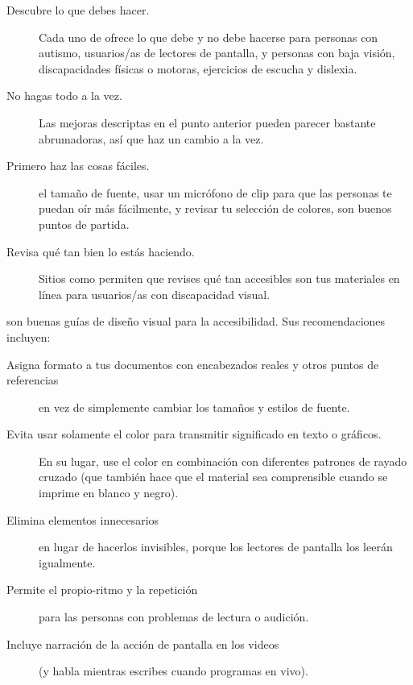 \begin{description}

\item[Descubre lo que debes hacer.]
   Cada uno de 
  ofrece lo que debe y no debe hacerse para personas con autismo,
  usuarios/as de lectores de pantalla,
  y personas con baja visión,
  discapacidades físicas o motoras,
  ejercicios de escucha
  y dislexia.

\item[No hagas todo a la vez.]
  Las mejoras descriptas en el punto anterior pueden parecer bastante abrumadoras,
  así que haz un cambio a la vez.

\item[Primero haz las cosas fáciles.]
  el tamaño de fuente,
  usar un micrófono de clip para que las personas te puedan oír más fácilmente,
  y revisar tu selección de colores, son buenos puntos de partida.

\item[Revisa qué tan bien lo estás haciendo.]
  Sitios como  permiten que revises
  qué tan accesibles son tus materiales en línea para usuarios/as con discapacidad visual.

\end{description}

\cite{Coom2012,Burg2015} son buenas guías de diseño visual para la accesibilidad.
Sus recomendaciones incluyen:

\begin{description}

\item[Asigna formato a tus documentos con encabezados reales y otros puntos de referencias]
  en vez de simplemente cambiar los tamaños y estilos de fuente.

\item[Evita usar solamente el color para transmitir significado en texto o gráficos.]
  En su lugar, use el color en combinación con diferentes patrones de rayado cruzado
  (que también hace que el material sea comprensible cuando se imprime en blanco y negro).

\item[Elimina elementos innecesarios]
  en lugar de hacerlos invisibles,
  porque los lectores de pantalla los leerán igualmente.

\item[Permite el propio-ritmo y la repetición]
  para las personas con problemas de lectura o audición.

\item[Incluye narración de la acción de pantalla en los videos]
  (y habla mientras escribes cuando programas en vivo).

\end{description}

